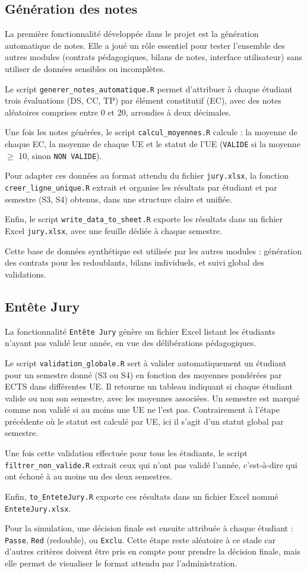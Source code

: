 \subsection{Génération des notes}
La première fonctionnalité développée dans le projet est la génération automatique de notes. Elle a joué un rôle essentiel pour tester l’ensemble des autres modules (contrats pédagogiques, bilans de notes, interface utilisateur) sans utiliser de données sensibles ou incomplètes.

Le script \texttt{generer\_notes\_automatique.R} permet d’attribuer à chaque étudiant trois évaluations (DS, CC, TP) par élément constitutif (EC), avec des notes aléatoires comprises entre 0 et 20, arrondies à deux décimales.

Une fois les notes générées, le script \texttt{calcul\_moyennes.R} calcule : la moyenne de chaque EC, la moyenne de chaque UE et le statut de l’UE (\texttt{VALIDE} si la moyenne $\geq$ 10, sinon \texttt{NON VALIDE}).

Pour adapter ces données au format attendu du fichier \texttt{jury.xlsx}, la fonction \texttt{creer\_ligne\_unique.R} extrait et organise les résultats par étudiant et par semestre (S3, S4) obtenus, dans une structure claire et unifiée.

Enfin, le script \texttt{write\_data\_to\_sheet.R} exporte les résultats dans un fichier Excel \texttt{jury.xlsx}, avec une feuille dédiée à chaque semestre.

Cette base de données synthétique est utilisée par les autres modules : génération des contrats pour les redoublants, bilans individuels, et suivi global des validations.

\subsection{Entête Jury}
La fonctionnalité \texttt{Entête Jury} génère un fichier Excel listant les étudiants n’ayant pas validé leur année, en vue des délibérations pédagogiques.

Le script \texttt{validation\_globale.R} sert à valider automatiquement un étudiant pour un semestre donné (S3 ou S4) en fonction des moyennes pondérées par ECTS dans différentes UE. Il retourne un tableau indiquant si chaque étudiant valide ou non son semestre, avec les moyennes associées. Un semestre est marqué comme non validé si au moins une UE ne l’est pas. Contrairement à l’étape précédente où le statut est calculé par UE, ici il s’agit d’un statut global par semestre.

Une fois cette validation effectuée pour tous les étudiants, le script \texttt{filtrer\_non\_valide.R} extrait ceux qui n'ont pas validé l’année, c’est-à-dire qui ont échoué à au moins un des deux semestres.

Enfin, \texttt{to\_EnteteJury.R} exporte ces résultats dans un fichier Excel nommé \texttt{EnteteJury.xlsx}.

Pour la simulation, une décision finale est ensuite attribuée à chaque étudiant : \texttt{Passe}, \texttt{Red} (redouble), ou \texttt{Exclu}. Cette étape reste aléatoire à ce stade car d'autres critères doivent être pris en compte pour prendre la décision finale, mais elle permet de visualiser le format attendu par l’administration.
